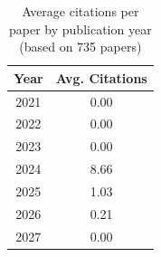 \begin{table}[htbp]
\centering
\caption{Average citations per paper by publication year (based on 735 papers)}
\label{tab:avg_citations_per_year}
\begin{tabular}{cc}
\toprule
Year & Avg. Citations \\
\midrule
\rowcolor{white}
2021 & 0.00 \\
\rowcolor{gray!15}
2022 & 0.00 \\
\rowcolor{white}
2023 & 0.00 \\
\rowcolor{gray!15}
2024 & 8.66 \\
\rowcolor{white}
2025 & 1.03 \\
\rowcolor{gray!15}
2026 & 0.21 \\
\rowcolor{white}
2027 & 0.00 \\
\bottomrule
\end{tabular}
\end{table}